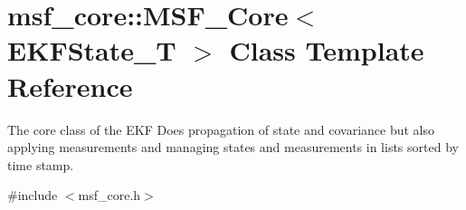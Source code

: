 \hypertarget{classmsf__core_1_1MSF__Core}{\section{msf\-\_\-core\-:\-:M\-S\-F\-\_\-\-Core$<$ E\-K\-F\-State\-\_\-\-T $>$ Class Template Reference}
\label{classmsf__core_1_1MSF__Core}
}


The core class of the E\-K\-F Does propagation of state and covariance but also applying measurements and managing states and measurements in lists sorted by time stamp.  




{\ttfamily \#include $<$msf\-\_\-core.\-h$>$}

